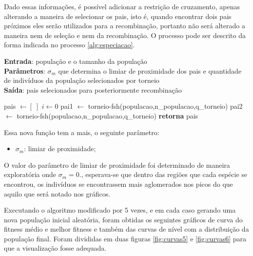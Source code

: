 \documentclass[a4paper, 12pt]{article}
\newenvironment{brprocess}[1][]
  {\begin{algorithm}[#1]
     \selectlanguage{brazilian}%
     \floatname{algorithm}{Processo}%
     \renewcommand{\algorithmicif}{\textbf{se}}%
     \renewcommand{\algorithmicfor}{\textbf{para}}%
     \renewcommand{\algorithmicdo}{\textbf{faça}}%
     \renewcommand{\algorithmicthen}{\textbf{faça}}%
     \renewcommand{\algorithmicend}{\textbf{fim}}%
     \renewcommand{\algorithmicwhile}{\textbf{enquanto}}%
     \renewcommand{\algorithmicelse}{\textbf{caso contrário}}%
  }
  {\end{algorithm}}
\begin{document}
Dado essas informações, é possível adicionar a restrição de cruzamento, apenas alterando a maneira de selecionar os pais, isto é, quando encontrar dois pais próximos eles serão utilizados para a recombinação, portanto não será alterado a maneira nem de seleção e nem da recombinação. O processo pode ser descrito da forma indicada no processo \ref{alg:especiacao}.
\begin{brprocess}[!ht]
    \cprotect\caption{Operador de especiação (\verb|especiação(populacao,|
    \verb|n_populacao,|\verb|q_torneio,|\sigma_m)}
    \textbf{Entrada}: população e o tamanho da população\\
    \textbf{Parâmetros}: $\sigma_m$ que determina o limiar de proximidade dos pais e quantidade de indivíduos da população selecionados por torneio\\
    \textbf{Saída}: pais selecionados para posteriormente recombinação
    \begin{algorithmic}
        \State pais $\gets [\;]$
        \State $i \gets 0$
        \State pai1 $\gets $ torneio-fsh(populacao,n_populacao,q_torneio)
            \State pai2 $\gets $ torneio-fsh(populacao,n_populacao,q_torneio)          
            \EndIf       
        \EndWhile         
        \State \textbf{retorna} pais
    \end{algorithmic}
    \label{alg:especiacao}
\end{brprocess}

Essa nova função tem a mais, o seguinte parâmetro:
\begin{itemize}
    \item $\sigma_m$: limiar de proximidade;
\end{itemize}

O valor do parâmetro de limiar de proximidade foi determinado de maneira exploratória onde $\sigma_m = 0.$, esperava-se que dentro das regiões que cada espécie se encontrou, os indivíduos se encontrassem mais aglomerados nos picos do que aquilo que será notado nos gráficos.

Executando o algoritmo modificado por 5 vezes, e em cada caso gerando uma nova população inicial aleatória, foram obtidas os seguintes gráficos de curva do fitness médio e melhor fitness e também das curvas de nível com a distribuição da população final. Foram divididas em duas figuras \ref{fig:curvas5} e \ref{fig:curvas6} para que a visualização fosse adequada. 
\end{document}
